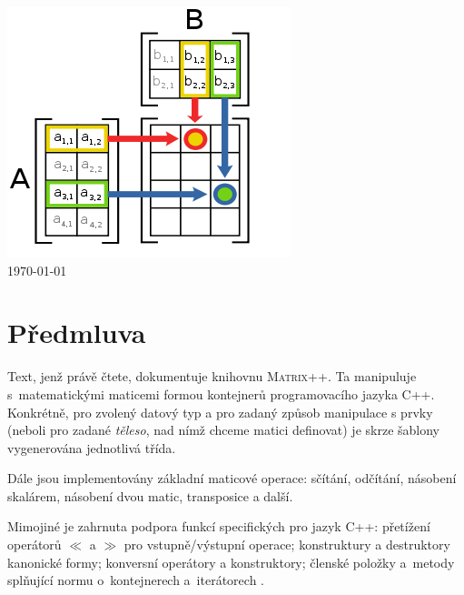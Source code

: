 \documentclass[11pt,a4paper]{article}
\newcommand{\cpp}{\textsc{C++}}
\newcommand{\mpp}{\textsc{Matrix++}}
\theoremstyle{remark}
\begin{document}
\begin{titlepage}
\begin{center}
\vfill
\includegraphics[viewport=140 15 150 65,scale=0.75]{./front.png}\\[1cm]    

{\large \today}

\end{center}

\end{titlepage}

\thispagestyle{empty}

\begin{abstract}
Dokumentace k zápočtovému programu.
Práce je implementací ša\-blo\-no\-va\-né knihovny pro práci s maticemi
representované ve formě kontejnerů jazyka~\cpp.
\end{abstract}

\pagebreak

\thispagestyle{empty}
\tableofcontents

\pagebreak

\setcounter{page}{1}
\pagestyle{headings}

\part{Předmluva}

Text, jenž právě čtete, dokumentuje knihovnu \mpp.
Ta manipuluje s~matematickými maticemi formou kontejnerů programovacího jazyka
C++.
Konkrétně, pro zvolený datový typ a pro zadaný způsob manipulace s prvky
(neboli pro zadané \emph{těleso\/}, nad nímž chceme matici definovat) je skrze
šablony vygenerována jednotlivá třída.

Dále jsou implementovány základní maticové operace: sčítání, odčítání, násobení
skalárem, násobení dvou matic, transposice a další.

Mimojiné je zahrnuta podpora funkcí specifických pro jazyk \cpp: přetí\-že\-ní
operátorů $\ll$ a $\gg$ pro vstupně/výstupní operace; konstruktury a
destruktory kanonické formy; konversní operátory a konstruktory; členské
po\-lož\-ky a~metody splňující normu o~kontejnerech a~iterátorech
\cite{iso-norma}.
\end{document}
